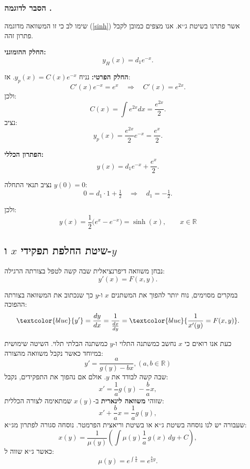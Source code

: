 \documentclass{article}
\numberwithin{equation}{section}
\newcounter{example}[section]
\renewcommand{\theexample}{\thesection.\arabic{example}}
\newcommand{\explanation}{%
  \subsubsection*{הסבר לדוגמה \theexample}%
}
\begin{document}
\explanation{}
שימו לב כי זו המשוואה מדוגמה (\ref{sinh}) אשר פתרנו בשיטת ג׳׳א. אנו מצפים כמובן לקבל פתרון זהה.

\textbf{החלק ההומוגני:}
\[
y_H(x) = d_1 e^{-x}.
\]

\textbf{החלק הפרטי:}  
נניח $y_p(x) = C(x)e^{-x}$.  
אז:
\[
C'(x)e^{-x} = e^x \quad \Rightarrow \quad C'(x) = e^{2x}.
\]
ולכן:
\[
C(x) = \int e^{2x}dx = \frac{e^{2x}}{2}.
\]
נציב:
\[
y_p(x) = \frac{e^{2x}}{2} e^{-x} = \frac{e^x}{2}.
\]

\textbf{הפתרון הכללי:}
\[
y(x) = d_1 e^{-x} + \frac{e^x}{2}.
\]

נציב תנאי התחלה $y(0)=0$:
\[
0 = d_1 \cdot 1 + \tfrac{1}{2} \quad \Rightarrow \quad d_1 = -\tfrac{1}{2}.
\]

ולכן:
\[
\boxed{\, y(x) = \frac{1}{2}\big(e^x - e^{-x}\big) = \sinh(x), \qquad x \in \mathbb{R} \,}
\]

\newpage
\subsection{שיטת החלפת תפקידי $x$ ו-$y$}

נבחן משוואה דיפרנציאלית שבה קשה לטפל בצורתה הרגילה:
\begin{equation}
y'(x) = F(x,y).
\end{equation}

במקרים מסוימים, נוח יותר להפוך את המשתנים $x$ ו-$y$ כך שנכתוב את המשוואה בצורתה ההפוכה:
\[
\textcolor{blue}{y'}=\frac{dy}{dx}=\frac{1}{\frac{dx}{dy}} = \textcolor{blue}{\frac{1}{x'(y)} = F(x,y)}.
\]

כעת אנו רואים כי $x$ נחשב כמשתנה התלוי ו-$y$ כמשתנה הבלתי תלוי.  
השיטה שימושית במיוחד כאשר נקבל משוואה מהצורה:
\begin{equation}
y' = \frac{a}{g(y) - bx}, (a,b\in\mathbb{R})
\end{equation}
שבה קשה לבודד את $y$. אולם אם נהפוך את התפקידים, נקבל:
\[
x' = \frac{1}{a}g(y) - \frac{b}{a}x,
\]
שזוהי \textbf{משוואה לינארית} ב-$x(y)$ שמתאימה לצורה הכללית:
\[
x' + \frac{b}{a}x = \frac{1}{a}g(y),
\]
שעבורה יש לנו נוסחה בשיטת ג׳׳א או בשיטת וריאצית הפרמטר. נוסחה סגורה לפתרון מג׳׳א:
\begin{equation}
\boxed{x(y)=\frac{1}{\mu(y)}\left(\int \mu(y)\frac{1}{a}\,g(x)\,dy + C\right)},
\end{equation}
כאשר ג׳׳א שווה ל:
\begin{equation}
\boxed{\mu(y)=e^{\int \frac{b}{a}}=e^{\frac{b}{a}y}}.
\end{equation}
\end{document}
